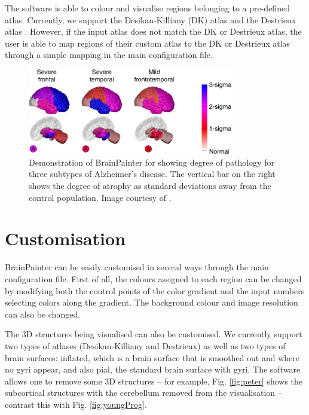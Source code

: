 \documentclass{llncs}
\begin{document}
The software is able to colour and visualise regions belonging to a pre-defined atlas. Currently, we support the Desikan-Killiany (DK) atlas \cite{desikan2006automated} and the Destrieux atlas \cite{destrieux2010automatic}. However, if the input atlas does not match the DK or Destrieux atlas, the user is able to map regions of their custom atlas to the DK or Destrieux atlas through a simple mapping in the main configuration file.  %


\begin{figure}
\centering
 \includegraphics[width=0.8\textwidth]{images/young_3brains.png}
 \caption{Demonstration of BrainPainter for showing degree of pathology for three subtypes of Alzheimer's disease. The vertical bar on the right shows the degree of atrophy as standard deviations away from the control population. Image courtesy of \cite{young2018uncovering}.}
 \label{fig:youngDegree}
\end{figure}

\section{Customisation}
\label{customisation}


BrainPainter can be easily customised in several ways through the main configuration file. First of all, the colours assigned to each region can be changed by modifying both the control points of the color gradient and the input numbers selecting colors along the gradient. The background colour and image resolution can also be changed.  

The 3D structures being visualised can also be customised. We currently support two types of atlases (Desikan-Killiany and Destrieux) as well as two types of brain surfaces: inflated, which is a brain surface that is smoothed out and where no gyri appear, and also pial, the standard brain surface with gyri. The software allows one to remove some 3D structures -- for example, Fig. \ref{fig:peter} shows the subcortical structures with the cerebellum removed from the visualisation -- contrast this with Fig. \ref{fig:youngProg}. 
 
\end{document}
